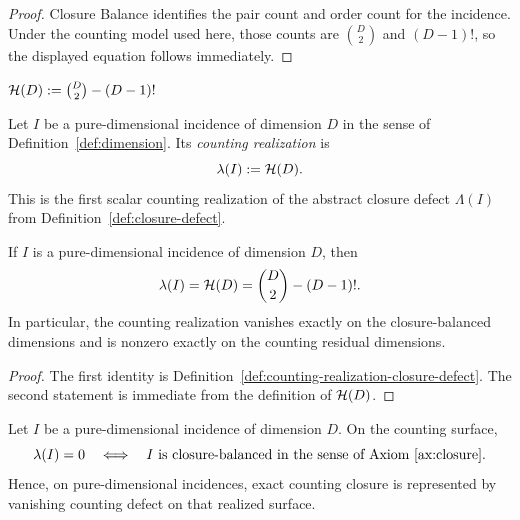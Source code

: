 \begin{proof}
Closure Balance identifies the pair count and order count for the incidence. Under the counting model used here, those counts are $\binom{D}{2}$ and $(D-1)!$, so the displayed equation follows immediately.
\end{proof}

\begin{definition}\label{def:holographic-operator}
$\mathcal{H}(D) := \binom{D}{2} - (D-1)!$
\end{definition}

\begin{definition}
\label{def:counting-realization-closure-defect}
Let \(I\) be a pure-dimensional incidence of dimension \(D\) in the sense of
Definition~\ref{def:dimension}. Its \emph{counting realization} is
\[
\lambda(I):=\mathcal{H}(D).
\]
This is the first scalar counting realization of the abstract closure defect
\(\Lambda(I)\) from Definition~\ref{def:closure-defect}.
\end{definition}

\begin{proposition}
\label{prop:pure-dimensional-counting-realization}
If \(I\) is a pure-dimensional incidence of dimension \(D\), then
\[
\lambda(I)=\mathcal{H}(D)=\binom{D}{2}-(D-1)!.
\]
In particular, the counting realization vanishes exactly on the
closure-balanced dimensions and is nonzero exactly on the counting residual
dimensions.
\end{proposition}

\begin{proof}
The first identity is Definition~\ref{def:counting-realization-closure-defect}.
The second statement is immediate from the definition of \(\mathcal{H}(D)\).
\end{proof}

\begin{proposition}
\label{prop:counting-closure-realizes-terminality}
Let \(I\) be a pure-dimensional incidence of dimension \(D\). On the counting
surface,
\[
\lambda(I)=0
\quad\Longleftrightarrow\quad
\text{\(I\) is closure-balanced in the sense of Axiom~\ref{ax:closure}}.
\]
Hence, on pure-dimensional incidences, exact counting closure is represented by
vanishing counting defect on that realized surface.
\end{proposition}

